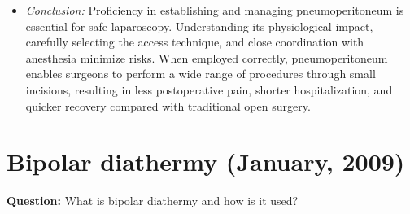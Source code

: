 \documentclass{article}
\begin{document}
\begin{itemize}
\item \emph{Conclusion:} Proficiency in establishing and managing pneumoperitoneum is essential for safe laparoscopy. Understanding its physiological impact, carefully selecting the access technique, and close coordination with anesthesia minimize risks. When employed correctly, pneumoperitoneum enables surgeons to perform a wide range of procedures through small incisions, resulting in less postoperative pain, shorter hospitalization, and quicker recovery compared with traditional open surgery.


\end{itemize}

\section{Bipolar diathermy (January, 2009)}

\textbf{Question:} What is bipolar diathermy and how is it used?
\end{document}
